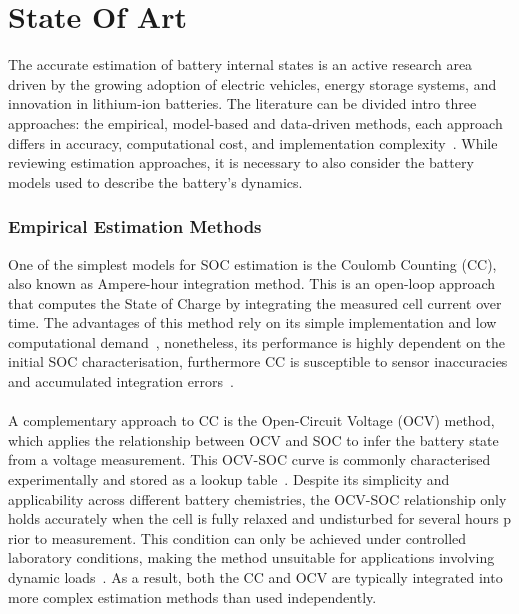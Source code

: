 \chapter{State Of Art}\label{sec:StateofArt}

The accurate estimation of battery internal states is an active research area driven by the growing 
adoption of electric vehicles, energy storage systems, and innovation in lithium-ion batteries. The literature
can be divided intro three approaches: the empirical, model-based and data-driven methods, each approach
differs in accuracy, computational cost, and implementation complexity~\cite{SOHBook}. While reviewing estimation approaches,
it is necessary to also consider the battery models used to describe the battery's dynamics.

\subsection{Empirical Estimation Methods}

One of the simplest models for \acs{SOC} estimation is the Coulomb Counting (\acs{CC}), also known as Ampere-hour integration method.
This is an open-loop approach that computes the State of Charge by integrating the measured cell current over time. 
The advantages of this method rely on its simple implementation and low computational demand~\cite{BatteryKalmanRaceCar}, 
nonetheless, its performance is highly dependent on the initial \acs{SOC} characterisation, furthermore \acs{CC} is susceptible 
to sensor inaccuracies and accumulated integration errors~\cite{EKFEV}\cite{SOCSOH}. 
\\
\\
A complementary approach to \acs{CC} is the Open-Circuit Voltage (\acs{OCV}) method, which applies the relationship between \acs{OCV} and \acs{SOC}
to infer the battery state from a voltage measurement. This \acs{OCV}-\acs{SOC} curve is commonly characterised experimentally and 
stored as a lookup table~\cite{SOHBook}. Despite its simplicity and applicability across different battery chemistries, 
the \acs{OCV}-\acs{SOC} relationship only holds accurately when the cell is fully relaxed and undisturbed for several hours p
rior to measurement. This condition can only be achieved under controlled laboratory conditions, making the method unsuitable 
for applications involving dynamic loads~\cite{plett2015battery}.
As a result, both the \acs{CC} and \acs{OCV} are typically integrated into more complex estimation methods than used independently.

